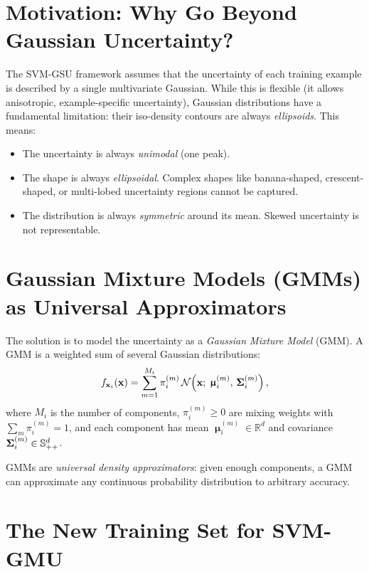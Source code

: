 \documentclass[11pt, letterpaper]{article}
\newcommand{\bSigma}{\vb{\Sigma}}
\newcommand{\bmu}{\boldsymbol{\upmu}}
\newcommand{\R}{\mathbb{R}}
\newcommand{\Norm}{\mathcal{N}}
\begin{document}
\section{Motivation: Why Go Beyond Gaussian Uncertainty?}\label{sec:gmu_motivation}

The SVM-GSU framework assumes that the uncertainty of each training example is described by a single multivariate Gaussian. While this is flexible (it allows anisotropic, example-specific uncertainty), Gaussian distributions have a fundamental limitation: their iso-density contours are always \emph{ellipsoids}. This means:
\begin{itemize}[leftmargin=2em]
    \item The uncertainty is always \emph{unimodal} (one peak).
    \item The shape is always \emph{ellipsoidal}. Complex shapes like banana-shaped, crescent-shaped, or multi-lobed uncertainty regions cannot be captured.
    \item The distribution is always \emph{symmetric} around its mean. Skewed uncertainty is not representable.
\end{itemize}

\section{Gaussian Mixture Models (GMMs) as Universal Approximators}

The solution is to model the uncertainty as a \emph{Gaussian Mixture Model} (GMM). A GMM is a weighted sum of several Gaussian distributions:
\begin{equation}\label{eq:gmm_pdf}
    f_{\vb{x}_i}(\vb{x}) = \sum_{m=1}^{M_i} \pi_i^{(m)}\, \Norm\!\left(\vb{x};\; \bmu_i^{(m)},\, \bSigma_i^{(m)}\right),
\end{equation}
where $M_i$ is the number of components, $\pi_i^{(m)} \geq 0$ are mixing weights with $\sum_m \pi_i^{(m)} = 1$, and each component has mean $\bmu_i^{(m)} \in \R^d$ and covariance $\bSigma_i^{(m)} \in \mathbb{S}^d_{++}$.

GMMs are \emph{universal density approximators}: given enough components, a GMM can approximate any continuous probability distribution to arbitrary accuracy.

\section{The New Training Set for SVM-GMU}\label{sec:gmu_training_set}
\end{document}
